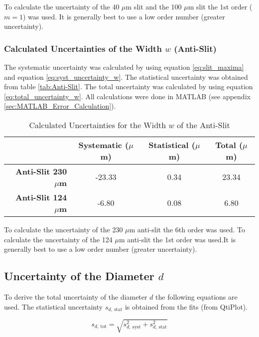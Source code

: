 To calculate the uncertainty of the 40 $\mu$m slit and the 100 $\mu$m slit the 1st order ($m = 1$) was used. It is generally best to use a low order number (greater uncertainty).

\subsubsection{Calculated Uncertainties of the Width $w$ (Anti-Slit)}
\label{subsubsec:Uncertainty_Width_Anti-Slit}
The systematic uncertainty was calculated by using equation \ref{eq:slit_maxima} and equation \ref{eq:syst_uncertainty_w}. The statistical uncertainty was obtained from table \ref{tab:Anti-Slit}. The total uncertainty was calculated by using equation \ref{eq:total_uncertainty_w}. All calculations were done in MATLAB (see appendix \ref{sec:MATLAB_Error_Calculation}).

\begin{table}[H]
	\centering
	\renewcommand{\arraystretch}{1.3}
	\begin{tabular}{r||c|c|c}
		& \textbf{Systematic} ($\mu$m) & \textbf{Statistical} ($\mu$m) & \textbf{Total} ($\mu$m) \\
		\hline\hline
		\textbf{Anti-Slit 230 $\mu$m} & -23.33 & 0.34 & 23.34 \\
		\textbf{Anti-Slit 124 $\mu$m} & -6.80 & 0.08 & 6.80 \\
	\end{tabular}
	\caption{Calculated Uncertainties for the Width $w$ of the Anti-Slit}
	\label{tab:Calculated_Uncertainties_Width_Anti-Slit}
\end{table}

To calculate the uncertainty of the 230 $\mu$m anti-slit the 6th order was used. To calculate the uncertainty of the 124 $\mu$m anti-slit the 1st order was used.It is generally best to use a low order number (greater uncertainty).

\newpage

\subsection{Uncertainty of the Diameter $d$}
\label{subsec:Uncertainty_Diameter}
To derive the total uncertainty of the diameter $d$ the following equations are used. The statistical uncertainty $s_{d,\ \text{stat}}$ is obtained from the fits (from QtiPlot).

\begin{equation}
s_{d,\ \text{tot}}=\sqrt{s_{d,\ \text{syst}}^2+s_{d,\ \text{stat}}^2}
\label{eq:total_uncertainty_d}
\end{equation}

